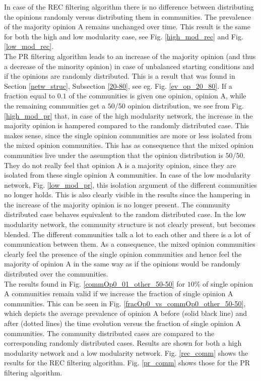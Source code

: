 \documentclass[11 pt , letterpaper , twoside , openright]{book}
\begin{document}
\newpage
\noindent
In case of the REC filtering algorithm there is no difference between distributing the opinions randomly versus distributing them in communities. The prevalence of the majority opinion A remains unchanged over time. This result is the same for both the high and low modularity case, see Fig. \ref{high_mod_rec} and Fig. \ref{low_mod_rec}.\\
\newline
The PR filtering algorithm leads to an increase of the majority opinion (and thus a decrease of the minority opinion) in case of unbalanced starting conditions and if the opinions are randomly distributed. This is a result that was found in Section \ref{netw_struc}, Subsection \ref{20-80}, see eg. Fig. \ref{ev_op_20_80}. If a fraction equal to $0.1$ of the communities is given one opinion, opinion A, while the remaining communities get a $50/50$ opinion distribution, we see from Fig. \ref{high_mod_pr} that, in case of the high modularity network, the increase in the majority opinion is hampered compared to the randomly distributed case. This makes sense, since the single opinion communities are more or less isolated from the mixed opinion communities. This has as consequence that the mixed opinion communities live under the assumption that the opinion distribution is $50/50$. They do not really feel that opinion A is a majority opinion, since they are isolated from these single opinion A communities. In case of the low modularity network, Fig. \ref{low_mod_pr}, this isolation argument of the different communities no longer holds. This is also clearly visible in the results since the hampering in the increase of the majority opinion is no longer present. The community distributed case behaves equivalent to the random distributed case. In the low modularity network, the community structure is not clearly present, but becomes blended. The different communities talk a lot to each other and there is a lot of communication between them. As a consequence, the mixed opinion communities clearly feel the presence of the single opinion communities and hence feel the majority of opinion A in the same way as if the opinions would be randomly distributed over the communities. \\
\newline
The results found in Fig. \ref{commOp0_01_other_50-50} for $10 \%$ of single opinion A communities remain valid if we increase the fraction of single opinion A communities. This can be seen in Fig. \ref{fracOp0_vs_commOp0_other_50-50}, which depicts the average prevalence of opinion A before (solid black line) and after (dotted lines) the time evolution versus the fraction of single opinion A communities. The community distributed cases are compared to the corresponding randomly distributed cases. Results are shown for both a high modularity network and a low modularity network. Fig. \ref{rec_comm} shows the results for the REC filtering algorithm. Fig. \ref{pr_comm} shows those for the PR filtering algorithm.\\
\end{document}
